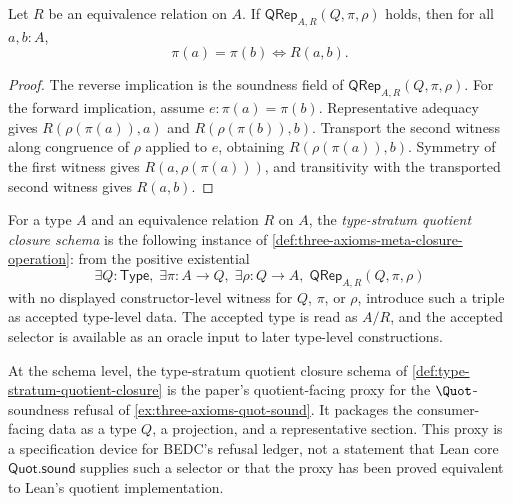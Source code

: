 \begin{lemma}
\label{lem:quotient-representative-package-exact}
Let $R$ be an equivalence relation on $A$. If $\mathsf{QRep}_{A,R}(Q,\pi,\rho)$ holds, then for all $a,b:A$,
$$
\pi(a)=\pi(b)\Longleftrightarrow R(a,b).
$$
\end{lemma}

\begin{proof}
The reverse implication is the soundness field of $\mathsf{QRep}_{A,R}(Q,\pi,\rho)$. For the forward implication, assume $e:\pi(a)=\pi(b)$. Representative adequacy gives $R(\rho(\pi(a)),a)$ and $R(\rho(\pi(b)),b)$. Transport the second witness along congruence of $\rho$ applied to $e$, obtaining $R(\rho(\pi(a)),b)$. Symmetry of the first witness gives $R(a,\rho(\pi(a)))$, and transitivity with the transported second witness gives $R(a,b)$.
\end{proof}

\begin{definition}
\label{def:type-stratum-quotient-closure}
For a type $A$ and an equivalence relation $R$ on $A$, the \emph{type-stratum quotient closure schema} is the following instance of \autoref{def:three-axioms-meta-closure-operation}: from the positive existential
$$
\exists Q:\mathsf{Type},\;\exists \pi:A\to Q,\;\exists \rho:Q\to A,\;\mathsf{QRep}_{A,R}(Q,\pi,\rho)
$$
with no displayed constructor-level witness for $Q$, $\pi$, or $\rho$, introduce such a triple as accepted type-level data. The accepted type is read as $A/R$, and the accepted selector is available as an oracle input to later type-level constructions.
\end{definition}

\begin{principle}
\label{thm:quot-sound-type-stratum-meta-closure}
At the schema level, the type-stratum quotient closure schema of \autoref{def:type-stratum-quotient-closure} is the paper's quotient-facing proxy for the $\Quot$-soundness refusal of \autoref{ex:three-axioms-quot-sound}. It packages the consumer-facing data as a type $Q$, a projection, and a representative section. This proxy is a specification device for BEDC's refusal ledger, not a statement that Lean core $\mathsf{Quot.sound}$ supplies such a selector or that the proxy has been proved equivalent to Lean's quotient implementation.
\end{principle}

